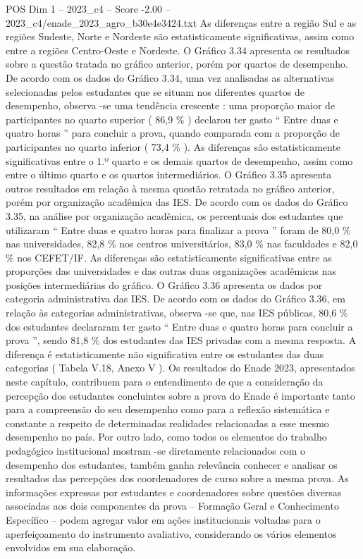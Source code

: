\begin{textsample}{POS Dim 1 – 2023\_c4 – Score -2.00 – 2023\_c4/enade\_2023\_agro\_b30e4e3424.txt}
As diferenças entre a região Sul e as regiões Sudeste, Norte e Nordeste são estatisticamente significativas, assim como entre a regiões Centro-Oeste e Nordeste.
O Gráfico 3.34 apresenta os resultados sobre a questão tratada no gráfico anterior, porém por quartos de desempenho.
De acordo com os dados do Gráfico 3.34, uma vez analisadas as alternativas selecionadas pelos estudantes que se situam nos diferentes quartos de desempenho, observa -se uma tendência crescente : uma proporção maior de participantes no quarto superior ( 86,9 \% ) declarou ter gasto “ Entre duas e quatro horas ” para concluir a prova, quando comparada com a proporção de participantes no quarto inferior ( 73,4 \% ).
As diferenças são estatisticamente significativas entre o 1.º quarto e os demais quartos de desempenho, assim como entre o último quarto e os quartos intermediários.
O Gráfico 3.35 apresenta outros resultados em relação à mesma questão retratada no gráfico anterior, porém por organização acadêmica das IES.
De acordo com os dados do Gráfico 3.35, na análise por organização acadêmica, os percentuais dos estudantes que utilizaram “ Entre duas e quatro horas para finalizar a prova ” foram de 80,0 \% nas universidades, 82,8 \% nos centros universitários, 83,0 \% nas faculdades e 82,0 \% nos CEFET/IF.
As diferenças são estatisticamente significativas entre as proporções das universidades e das outras duas organizações acadêmicas nas posições intermediárias do gráfico.
O Gráfico 3.36 apresenta os dados por categoria administrativa das IES.
De acordo com os dados do Gráfico 3.36, em relação às categorias administrativas, observa -se que, nas IES públicas, 80,6 \% dos estudantes declararam ter gasto “ Entre duas e quatro horas para concluir a prova ”, sendo 81,8 \% dos estudantes das IES privadas com a mesma resposta.
A diferença é estatisticamente não significativa entre os estudantes das duas categorias ( Tabela V.18, Anexo V ).
Os resultados do Enade 2023, apresentados neste capítulo, contribuem para o entendimento de que a consideração da percepção dos estudantes concluintes sobre a prova do Enade é importante tanto para a compreensão do seu desempenho como para a reflexão sistemática e constante a respeito de determinadas realidades relacionadas a esse mesmo desempenho no país.
Por outro lado, como todos os elementos do trabalho pedagógico institucional mostram -se diretamente relacionados com o desempenho dos estudantes, também ganha relevância conhecer e analisar os resultados das percepções dos coordenadores de curso sobre a mesma prova.
As informações expressas por estudantes e coordenadores sobre questões diversas associadas aos dois componentes da prova – Formação Geral e Conhecimento Específico – podem agregar valor em ações institucionais voltadas para o aperfeiçoamento do instrumento avaliativo, considerando os vários elementos envolvidos em sua elaboração.

\end{textsample}
